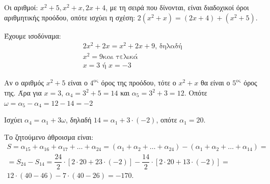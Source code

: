 
\begin{alist}
\item Οι αριθμοί: $x^2 + 5, x^2 + x, 2x + 4$, με τη σειρά που δίνονται, είναι διαδοχικοί όροι
αριθμητικής προόδου, οπότε ισχύει η σχέση: $2(x^2 + x) = (2x + 4) + (x^2 + 5)$.

Έχουμε ισοδύναμα:
\begin{gather*}
2x^2 + 2x = x^2 + 2x + 9\text{, δηλαδή} \\
x^2 = 9\text{και τελικά} \\
x = 3 \text{ ή } x = -3
\end{gather*}

\item 
\begin{rlist}
\item Αν ο αριθμός $x^2 + 5$ είναι ο $4^\text{ος}$ όρος της προόδου, τότε ο $x^2 + x$ θα είναι ο $5^\text{ος}$ όρος
της. Άρα για $x = 3$, $\alpha_4 = 3^2 + 5 = 14$ και $\alpha_5 = 3^2 + 3 = 12$. Οπότε $\omega = \alpha_5 - \alpha_4 = 12 - 14 = -2$

\item Ισχύει $\alpha_4 = \alpha_1 + 3\omega$, δηλαδή $14 = \alpha_1 + 3 \cdot (-2)$, οπότε $\alpha_1 = 20$.

\item Το ζητούμενο άθροισμα είναι:
\begin{gather*}
S = \alpha_{15} + \alpha_{16} + \alpha_{17} + \dots + \alpha_{24} = (\alpha_1 + \alpha_2 + \dots + \alpha_{24}) - (\alpha_1 + \alpha_2 + \dots + \alpha_{14}) = \\
= S_{24} - S_{14} = \dfrac{24}{2} \cdot [2 \cdot 20 + 23 \cdot (-2)] - \dfrac{14}{2} \cdot [2 \cdot 20 + 13 \cdot (-2)] = \\
12 \cdot (40 - 46) - 7 \cdot (40 - 26) = -170.
\end{gather*}
\end{rlist}
\end{alist}

